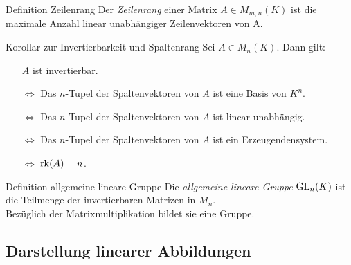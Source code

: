 \documentclass[main.tex]{subfiles}
\begin{document}
\begin{karte}{Definition Zeilenrang}
    Der \textit{Zeilenrang} einer Matrix \(A \in M_{m,n}(K)\) ist 
    die maximale Anzahl linear unabhängiger Zeilenvektoren von A.
\end{karte}
\begin{karte}{Korollar zur Invertierbarkeit und Spaltenrang}
    Sei \(A \in M_n(K)\). Dann gilt:
    \begin{itemize}
        \item[] \(A\) ist invertierbar.
        \item[\(\Leftrightarrow \)] Das \(n\)-Tupel der 
        Spaltenvektoren von \(A\) ist eine Basis von \(K^n\).
        \item[\(\Leftrightarrow \)] Das \(n\)-Tupel der 
        Spaltenvektoren von \(A\) ist linear unabhängig.
        \item[\(\Leftrightarrow \)] Das \(n\)-Tupel der 
        Spaltenvektoren von \(A\) ist ein Erzeugendensystem. 
        \item[\(\Leftrightarrow \)] \(\operatorname{rk}(A) = n\).        
    \end{itemize}
\end{karte}
\begin{karte}{Definition allgemeine lineare Gruppe}
    Die \textit{allgemeine lineare Gruppe} \( \operatorname{GL}_n(K) \) ist die Teilmenge 
    der invertierbaren Matrizen in \(M_n\). \\ 
    Bezüglich der Matrixmultiplikation bildet sie eine Gruppe.
\end{karte}

\subsection*{Darstellung linearer Abbildungen}  
\end{document}
